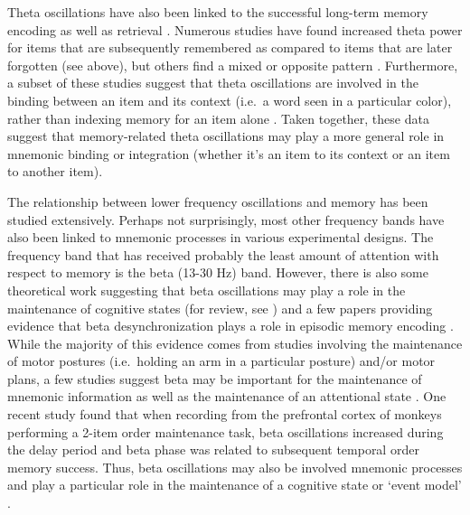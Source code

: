 Theta oscillations have also been linked to the successful long-term
memory encoding
\autocites{guderian_medial_2009}{fell_medial_2011}{sederberg_theta_2003}{friese_successful_2013}{summerfield_coherent_2005}{staudigl_theta_2013}{white_theta_2013}{pastotter_distinct_2014}{osipova_theta_2006}{hanslmayr_relationship_2011}
as well as retrieval
\autocites{jacobs_eeg_2006}{addante_prestimulus_2011}{osipova_theta_2006}{bastiaansen_i_2008}{watrous_frequency-specific_2013}.
Numerous studies have found increased theta power for items that are
subsequently remembered as compared to items that are later forgotten
(see above), but others find a mixed or opposite pattern
\autocites{long_subsequent_2014}{burke_synchronous_2013}{greenberg_decreases_2015}{pastotter_distinct_2014}.
Furthermore, a subset of these studies suggest that theta oscillations
are involved in the binding between an item and its context (i.e.~a word
seen in a particular color), rather than indexing memory for an item
alone \autocites{summerfield_coherent_2005}{staudigl_theta_2013}. Taken
together, these data suggest that memory-related theta oscillations may
play a more general role in mnemonic binding or integration (whether
it's an item to its context or an item to another item).

The relationship between lower frequency oscillations and memory has
been studied extensively. Perhaps not surprisingly, most other frequency
bands have also been linked to mnemonic processes in various
experimental designs. The frequency band that has received probably the
least amount of attention with respect to memory is the beta (13-30 Hz)
band. However, there is also some theoretical work suggesting that beta
oscillations may play a role in the maintenance of cognitive states (for
review, see \textcite{engel_beta-band_2010}) and a few papers providing
evidence that beta desynchronization plays a role in episodic memory
encoding
\autocites{hanslmayr_relationship_2011}{hanslmayr_entrainment_2014}{hanslmayr_oscillations_2016}.
While the majority of this evidence comes from studies involving the
maintenance of motor postures (i.e.~holding an arm in a particular
posture) and/or motor plans, a few studies suggest beta may be important
for the maintenance of mnemonic information
\autocites{tallon-baudry_sustained_1999}{tallon-baudry_oscillatory_2001}{tallon-baudry_oscillatory_2004}
as well as the maintenance of an attentional state
\autocite{buschman_top-down_2007}. One recent study found that when
recording from the prefrontal cortex of monkeys performing a 2-item
order maintenance task, beta oscillations increased during the delay
period and beta phase was related to subsequent temporal order memory
success. Thus, beta oscillations may also be involved mnemonic processes
and play a particular role in the maintenance of a cognitive state or
`event model' \autocite{engel_beta-band_2010}.

